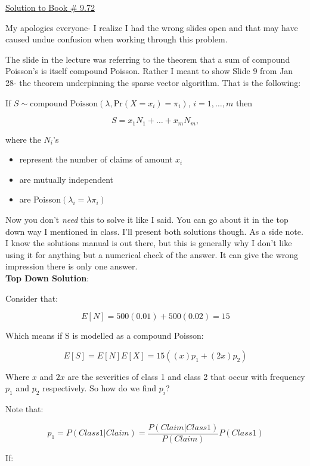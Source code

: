 \documentclass[10pt,a4paper]{article}
\author{Andrew Fleck}
\begin{document}
\begin{center}
{\Large \underline{Solution to Book \# 9.72}} 
\end{center}

My apologies everyone- I realize I had the wrong slides open and that may have caused undue confusion when working through this problem. 

The slide in the lecture was referring to the theorem that a sum of compound Poisson's is itself compound Poisson. Rather I meant to show Slide 9 from Jan 28- the theorem underpinning the sparse vector algorithm. That is the following:

\begin{mdframed}
If $S\sim\text{compound Poisson}(\lambda,\mbox{Pr} (X = x_i) =\pi_i)$, $i=1,\ldots,m$ then


$$S=x_1N_1+\ldots+x_mN_m,$$

where the $N_i$'s
\begin{itemize}
\item represent the number of claims of amount $x_i$
\item are mutually independent
\item are Poisson$(\lambda_i=\lambda \pi_i)$
\end{itemize}
\end{mdframed}

Now you don't \textit{need} this to solve it like I said. You can go about it in the top down way I mentioned in class. I'll present both solutions though. As a side note. I know the solutions manual is out there, but this is generally why I don't like using it for anything but a numerical check of the answer. It can give the wrong impression there is only one answer.  \\


\noindent\textbf{Top Down Solution}:

Consider that: 

$$ E[N] = 500(0.01) + 500(0.02) = 15 $$

Which means if S is modelled as a compound Poisson: 

$$ E[S] = E[N]E[X] = 15( (x)p_1 + (2x)p_2 ) $$

Where $x$ and $2x$ are the severities of class 1 and class 2 that occur with frequency $p_1$ and $p_2$ respectively. So how do we find $p_i$?

Note that:

$$ p_1 = P(Class1 | Claim) = \frac{ P(Claim|Class1) }{ P(Claim) } P(Class1) $$

If:
\end{document}
